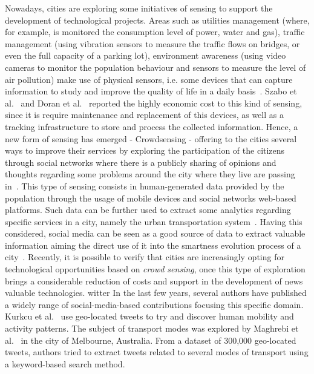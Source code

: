 Nowadays, cities are exploring some initiatives of sensing to support the development of technological projects. Areas such as utilities management (where, for example, is monitored the consumption level of power, water and gas), traffic management (using vibration sensors to measure the traffic flows on bridges, or even the full capacity of a parking lot), environment awareness (using video cameras to monitor the population behaviour and sensors to measure the level of air pollution) make use of physical sensors, i.e. some devices that can capture information to study and improve the quality of life in a daily basis~\cite{kn:Doran2015}. Szabo et al.~\cite{kn:Szabo2013} and Doran et al.~\cite{kn:Doran2015} reported the highly economic cost to this kind of sensing, since it is require maintenance and replacement of this devices, as well as a tracking infrastructure to store and process the collected information. Hence, a new form of sensing has emerged - \gls{Crowdsensing} - offering to the cities several ways to improve their services by exploring the participation of the citizens through social networks where there is a publicly sharing of  opinions and thoughts regarding some problems around the city where they live are passing in~\cite{kn:Roitman2012}. This type of sensing consists in human-generated data provided by the population through the usage of mobile devices and social networks web-based platforms. Such data can be further used to extract some analytics regarding specific services in a city, namely the urban transportation system~\cite{kn:Roitman2012}. Having this considered, social media can be seen as a good source of data to extract valuable information aiming the direct use of it into the smartness evolution process of a city~\cite{kn:Szabo2013}. Recently, it is possible to verify that cities are increasingly opting for technological opportunities based on \textit{crowd sensing}, once this type of exploration brings a considerable reduction of costs and support in the development of news valuable technologies.
witter
In the last few years, several authors have published a widely range of social-media-based contributions focusing this specific domain. Kurkcu et al.~\cite{kurkcu2016evaluating} use geo-located tweets to try and discover human mobility and activity patterns. The subject of transport modes was explored by Maghrebi et al.~\cite{maghrebi2016transportation} in the city of Melbourne, Australia. From a dataset of 300,000 geo-located tweets, authors tried to extract tweets related to several modes of transport using a keyword-based search method. 

